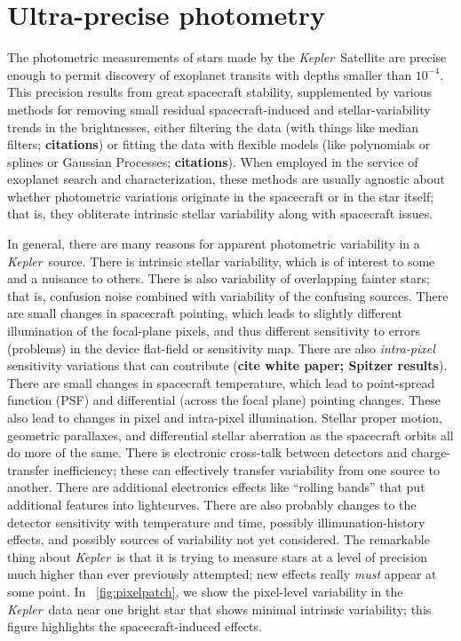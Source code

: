 \documentclass[12pt, preprint]{aastex}
\newcommand{\project}[1]{\textsl{#1}}
\newcommand{\Kepler}{\project{Kepler}}
\newcommand{\todo}[1]{\textbf{#1}}
\begin{document}
\section{Ultra-precise photometry}

The photometric measurements of stars made by the \Kepler\ Satellite are precise enough
  to permit discovery of exoplanet transits with depths smaller than $10^{-4}$.
This precision results from great spacecraft stability,
  supplemented by various methods for removing small residual spacecraft-induced and stellar-variability trends in the brightnesses,
  either filtering the data (with things like median filters; \todo{citations})
  or fitting the data with flexible models (like polynomials or splines or Gaussian Processes; \todo{citations}).
When employed in the service of exoplanet search and characterization,
  these methods are usually agnostic about whether photometric variations originate in the spacecraft or in the star itself;
  that is, they obliterate intrinsic stellar variability along with spacecraft issues.

In general, there are many reasons for apparent photometric variability in a \Kepler\ source.
There is intrinsic stellar variability,
  which is of interest to some and a nuisance to others.
There is also variability of overlapping fainter stars;
  that is, confusion noise combined with variability of the confusing sources.
There are small changes in spacecraft pointing,
  which leads to slightly different illumination of the focal-plane pixels,
  and thus different sensitivity to errors (problems) in the device flat-field or sensitivity map.
There are also \emph{intra-pixel} sensitivity variations that can contribute (\todo{cite white paper; Spitzer results}).
There are small changes in spacecraft temperature,
  which lead to point-spread function (PSF) and differential (across the focal plane) pointing changes.
These also lead to changes in pixel and intra-pixel illumination.
Stellar proper motion, geometric parallaxes, and differential stellar aberration as the spacecraft orbits all do more of the same.
There is electronic cross-talk between detectors and charge-transfer inefficiency;
  these can effectively transfer variability from one source to another.
There are additional electronics effects like ``rolling bands'' that put additional features into lightcurves.
There are also probably changes to the detector sensitivity with temperature and time,
  possibly illimunation-history effects,
  and possibly sources of variability not yet considered.
The remarkable thing about \Kepler\ is that it is trying to measure stars at a level of precision
  much higher than ever previously attempted;
  new effects really \emph{must} appear at some point.
In \figurename~\ref{fig:pixelpatch}, we show the pixel-level variability in the \Kepler\ data
  near one bright star that shows minimal intrinsic variability;
  this figure highlights the spacecraft-induced effects.
\end{document}

